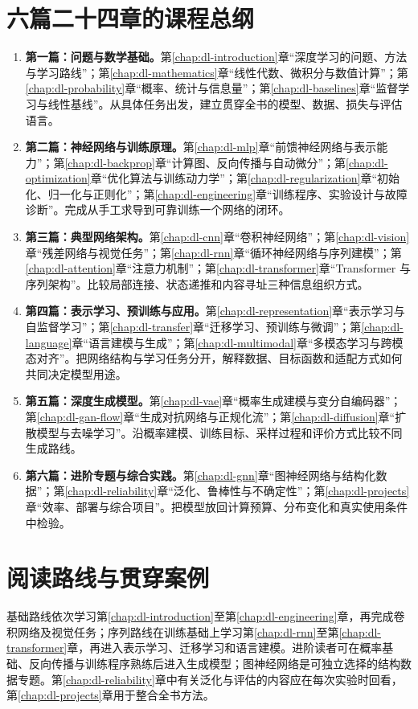 \documentclass[UTF8,12pt,a4paper,fontset=fandol]{ctexbook}
\begin{document}
\section*{六篇二十四章的课程总纲}
\begin{enumerate}
  \item \textbf{第一篇：问题与数学基础。}第\ref{chap:dl-introduction}章“深度学习的问题、方法与学习路线”；第\ref{chap:dl-mathematics}章“线性代数、微积分与数值计算”；第\ref{chap:dl-probability}章“概率、统计与信息量”；第\ref{chap:dl-baselines}章“监督学习与线性基线”。从具体任务出发，建立贯穿全书的模型、数据、损失与评估语言。
  \item \textbf{第二篇：神经网络与训练原理。}第\ref{chap:dl-mlp}章“前馈神经网络与表示能力”；第\ref{chap:dl-backprop}章“计算图、反向传播与自动微分”；第\ref{chap:dl-optimization}章“优化算法与训练动力学”；第\ref{chap:dl-regularization}章“初始化、归一化与正则化”；第\ref{chap:dl-engineering}章“训练程序、实验设计与故障诊断”。完成从手工求导到可靠训练一个网络的闭环。
  \item \textbf{第三篇：典型网络架构。}第\ref{chap:dl-cnn}章“卷积神经网络”；第\ref{chap:dl-vision}章“残差网络与视觉任务”；第\ref{chap:dl-rnn}章“循环神经网络与序列建模”；第\ref{chap:dl-attention}章“注意力机制”；第\ref{chap:dl-transformer}章“Transformer 与序列架构”。比较局部连接、状态递推和内容寻址三种信息组织方式。
  \item \textbf{第四篇：表示学习、预训练与应用。}第\ref{chap:dl-representation}章“表示学习与自监督学习”；第\ref{chap:dl-transfer}章“迁移学习、预训练与微调”；第\ref{chap:dl-language}章“语言建模与生成”；第\ref{chap:dl-multimodal}章“多模态学习与跨模态对齐”。把网络结构与学习任务分开，解释数据、目标函数和适配方式如何共同决定模型用途。
  \item \textbf{第五篇：深度生成模型。}第\ref{chap:dl-vae}章“概率生成建模与变分自编码器”；第\ref{chap:dl-gan-flow}章“生成对抗网络与正规化流”；第\ref{chap:dl-diffusion}章“扩散模型与去噪学习”。沿概率建模、训练目标、采样过程和评价方式比较不同生成路线。
  \item \textbf{第六篇：进阶专题与综合实践。}第\ref{chap:dl-gnn}章“图神经网络与结构化数据”；第\ref{chap:dl-reliability}章“泛化、鲁棒性与不确定性”；第\ref{chap:dl-projects}章“效率、部署与综合项目”。把模型放回计算预算、分布变化和真实使用条件中检验。
\end{enumerate}

\section*{阅读路线与贯穿案例}
基础路线依次学习第\ref{chap:dl-introduction}至第\ref{chap:dl-engineering}章，再完成卷积网络及视觉任务；序列路线在训练基础上学习第\ref{chap:dl-rnn}至第\ref{chap:dl-transformer}章，再进入表示学习、迁移学习和语言建模。进阶读者可在概率基础、反向传播与训练程序熟练后进入生成模型；图神经网络是可独立选择的结构数据专题。第\ref{chap:dl-reliability}章中有关泛化与评估的内容应在每次实验时回看，第\ref{chap:dl-projects}章用于整合全书方法。
\end{document}
